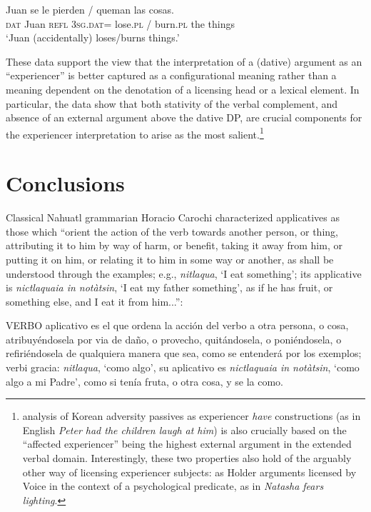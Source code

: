 \documentclass[output=paper,colorlinks,citecolor=brown,nonflat]{./langscibook}
\begin{document}
\ea%
    \label{ex:cuervo:22}
     {Juan} {se} {le} {pierden} / {queman} {las} {cosas}.\\
    \textsc{dat} Juan \textsc{refl} \textsc{3sg.dat}= lose.\textsc{pl} / burn.\textsc{pl}  the things\\
    \glt ‘Juan (accidentally) loses/burns things.’
    \z

These data support the view that the interpretation of a (dative) argument as an “experiencer” is better captured as a configurational meaning rather than a meaning dependent on the denotation of a licensing head or a lexical element. In particular, the data show that both stativity of the verbal complement, and absence of an external argument above the dative DP, are crucial components for the experiencer interpretation to arise as the most salient.\footnote{ analysis of Korean adversity passives as experiencer \textit{have} constructions (as in English \textit{Peter had the children laugh at him}) is also crucially based on the “affected experiencer” being the highest external argument in the extended verbal domain. Interestingly, these two properties also hold of the arguably other way of licensing experiencer subjects: as Holder arguments licensed by Voice in the context of a psychological predicate, as in \textit{Natasha fears lighting}.} 

\section{Conclusions}\label{sec:cuervo:5}

Classical Nahuatl grammarian Horacio Carochi characterized applicatives as those which “orient the action of the verb towards another person, or thing, attributing it to him by way of harm, or benefit, taking it away from him, or putting it on him, or relating it to him in some way or another, as shall be understood through the examples; e.g., \textit{nitlaqua}, ‘I eat something’; its applicative is \textit{nictlaquaia in notàtsin}, ‘I eat my father something’, as if he has fruit, or something else, and I eat it from him...”: 

VERBO aplicativo es el que ordena la acción del verbo a otra persona, o cosa, atribuyéndosela por via de daño, o provecho, quitándosela, o poniéndosela, o refiriéndosela de qualquiera manera que sea, como se entenderá por los exemplos; verbi gracia: \textit{nitlaqua}, ‘como algo’, su aplicativo es \textit{nictlaquaia in notàtsin}, ‘como algo a mi Padre’, como si tenía fruta, o otra cosa, y se la como. \citep[466]{Carochi1645}
\end{document}
